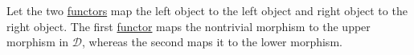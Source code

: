 Let the two \hyperref[D3.35]{functors} map the left object to the left object and right object to the right object. The first \hyperref[D3.35]{functor} maps the nontrivial morphism to the upper morphism in $\mathcal{D}$, whereas the second maps it to the lower morphism.
